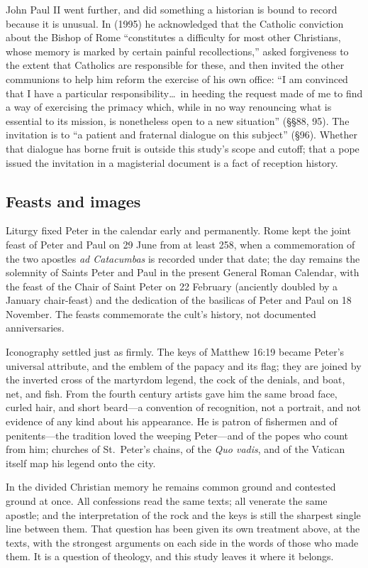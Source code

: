 John Paul II went further, and did something a historian is bound to record
because it is unusual. In  (1995) he acknowledged that the
Catholic conviction about the Bishop of Rome ``constitutes a difficulty for
most other Christians, whose memory is marked by certain painful
recollections,'' asked forgiveness to the extent that Catholics are
responsible for these, and then invited the other communions to help him
reform the exercise of his own office: ``I am convinced that I have a
particular responsibility\ldots\ in heeding the request made of me to find a
way of exercising the primacy which, while in no way renouncing what is
essential to its mission, is nonetheless open to a new situation''
(\S\S 88, 95). The invitation is to ``a patient and fraternal dialogue on
this subject'' (\S 96). Whether that dialogue has borne fruit is outside this
study's scope and cutoff; that a pope issued the invitation in a magisterial
document is a fact of reception history.

\subsection{Feasts and images}

Liturgy fixed Peter in the calendar early and permanently. Rome kept the
joint feast of Peter and Paul on 29 June from at least 258, when a
commemoration of the two apostles \textit{ad Catacumbas} is recorded under
that date; the day remains the solemnity of Saints Peter and Paul in the
present General Roman Calendar, with the feast of the Chair of Saint Peter
on 22 February (anciently doubled by a January chair-feast) and the
dedication of the basilicas of Peter and Paul on 18 November. The feasts
commemorate the cult's history, not documented anniversaries.

Iconography settled just as firmly. The keys of Matthew 16:19 became Peter's
universal attribute, and the emblem of the papacy and its flag; they are
joined by the inverted cross of the martyrdom legend, the cock of the
denials, and boat, net, and fish. From the fourth century artists gave him
the same broad face, curled hair, and short beard---a convention of
recognition, not a portrait, and not evidence of any kind about his
appearance. He is patron of fishermen and of penitents---the tradition loved
the weeping Peter---and of the popes who count from him; churches of
St.~Peter's chains, of the \textit{Quo vadis}, and of the Vatican itself map
his legend onto the city.

In the divided Christian memory he remains common ground and contested ground
at once. All confessions read the same texts; all venerate the same apostle;
and the interpretation of the rock and the keys is still the sharpest single
line between them. That question has been given its own treatment above, at
the texts, with the strongest arguments on each side in the words of those
who made them. It is a question of theology, and this study leaves it where
it belongs.
